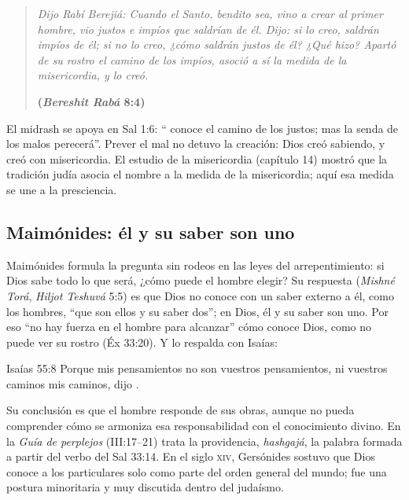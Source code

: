 \begin{quote}\itshape
Dijo Rabí Berejiá: Cuando el Santo, bendito sea, vino a crear al primer hombre, vio justos e impíos que saldrían de él. Dijo: si lo creo, saldrán impíos de él; si no lo creo, ¿cómo saldrán justos de él? ¿Qué hizo? Apartó de su rostro el camino de los impíos, asoció a sí la medida de la misericordia, y lo creó.\par\hfill{\upshape\small\bfseries\textcolor{azulp}{(\emph{Bereshit Rabá} 8:4)}}
\end{quote}

El midrash se apoya en Sal 1:6: ``\SENOR{} conoce el camino de los justos; mas la senda de los malos perecerá''. Prever el mal no detuvo la creación: Dios creó sabiendo, y creó con misericordia. El estudio de la misericordia (capítulo 14) mostró que la tradición judía asocia el nombre \SENOR{} a la medida de la misericordia; aquí esa medida se une a la presciencia.


\subsection{Maimónides: él y su saber son uno}
Maimónides formula la pregunta sin rodeos en las leyes del arrepentimiento: si Dios sabe todo lo que será, ¿cómo puede el hombre elegir? Su respuesta (\emph{Mishné Torá}, \emph{Hiljot Teshuvá} 5:5) es que Dios no conoce con un saber externo a él, como los hombres, ``que son ellos y su saber dos''; en Dios, él y su saber son uno. Por eso ``no hay fuerza en el hombre para alcanzar'' cómo conoce Dios, como no puede ver su rostro (Éx 33:20). Y lo respalda con Isaías:

\begin{verso}{Isaías 55:8}
Porque mis pensamientos no son vuestros pensamientos, ni vuestros caminos mis caminos, dijo \SENOR{}.
\end{verso}

Su conclusión es que el hombre responde de sus obras, aunque no pueda comprender cómo se armoniza esa responsabilidad con el conocimiento divino. En la \emph{Guía de perplejos} (III:17--21) trata la providencia, \emph{hashgajá}, la palabra formada a partir del verbo del Sal 33:14. En el siglo \textsc{xiv}, Gersónides sostuvo que Dios conoce a los particulares solo como parte del orden general del mundo; fue una postura minoritaria y muy discutida dentro del judaísmo.

